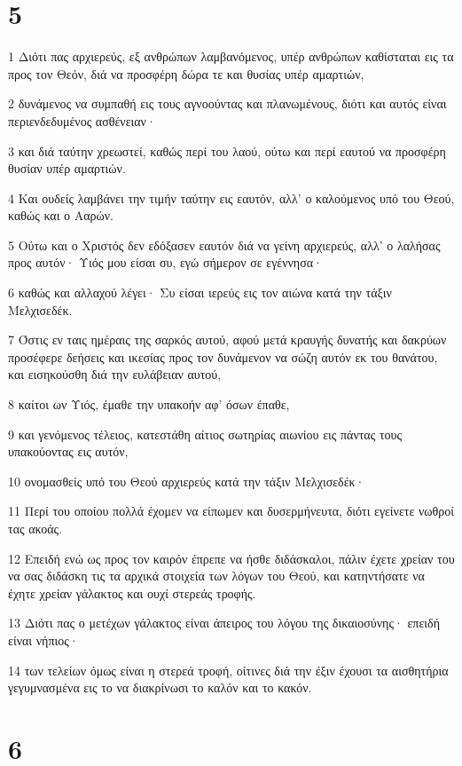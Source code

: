 \chapter{5}

\par 1 Διότι πας αρχιερεύς, εξ ανθρώπων λαμβανόμενος, υπέρ ανθρώπων καθίσταται εις τα προς τον Θεόν, διά να προσφέρη δώρα τε και θυσίας υπέρ αμαρτιών,
\par 2 δυνάμενος να συμπαθή εις τους αγνοούντας και πλανωμένους, διότι και αυτός είναι περιενδεδυμένος ασθένειαν·
\par 3 και διά ταύτην χρεωστεί, καθώς περί του λαού, ούτω και περί εαυτού να προσφέρη θυσίαν υπέρ αμαρτιών.
\par 4 Και ουδείς λαμβάνει την τιμήν ταύτην εις εαυτόν, αλλ' ο καλούμενος υπό του Θεού, καθώς και ο Ααρών.
\par 5 Ούτω και ο Χριστός δεν εδόξασεν εαυτόν διά να γείνη αρχιερεύς, αλλ' ο λαλήσας προς αυτόν· Υιός μου είσαι συ, εγώ σήμερον σε εγέννησα·
\par 6 καθώς και αλλαχού λέγει· Συ είσαι ιερεύς εις τον αιώνα κατά την τάξιν Μελχισεδέκ.
\par 7 Όστις εν ταις ημέραις της σαρκός αυτού, αφού μετά κραυγής δυνατής και δακρύων προσέφερε δεήσεις και ικεσίας προς τον δυνάμενον να σώζη αυτόν εκ του θανάτου, και εισηκούσθη διά την ευλάβειαν αυτού,
\par 8 καίτοι ων Υιός, έμαθε την υπακοήν αφ' όσων έπαθε,
\par 9 και γενόμενος τέλειος, κατεστάθη αίτιος σωτηρίας αιωνίου εις πάντας τους υπακούοντας εις αυτόν,
\par 10 ονομασθείς υπό του Θεού αρχιερεύς κατά την τάξιν Μελχισεδέκ·
\par 11 Περί του οποίου πολλά έχομεν να είπωμεν και δυσερμήνευτα, διότι εγείνετε νωθροί τας ακοάς.
\par 12 Επειδή ενώ ως προς τον καιρόν έπρεπε να ήσθε διδάσκαλοι, πάλιν έχετε χρείαν του να σας διδάσκη τις τα αρχικά στοιχεία των λόγων του Θεού, και κατηντήσατε να έχητε χρείαν γάλακτος και ουχί στερεάς τροφής.
\par 13 Διότι πας ο μετέχων γάλακτος είναι άπειρος του λόγου της δικαιοσύνης· επειδή είναι νήπιος·
\par 14 των τελείων όμως είναι η στερεά τροφή, οίτινες διά την έξιν έχουσι τα αισθητήρια γεγυμνασμένα εις το να διακρίνωσι το καλόν και το κακόν.

\chapter{6}

